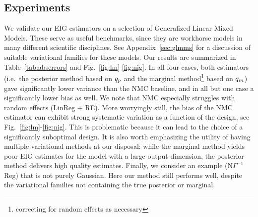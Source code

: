 \subsection{Experiments}
\label{sec:experiments}

We validate our EIG estimators on a selection of Generalized Linear Mixed Models. These serve as useful benchmarks, since they are workhorse models in many different scientific disciplines. See Appendix~\ref{sec:glmms} for a discussion of suitable variational families for these models. Our results are summarized in Table~\ref{tab:abserrors} and Fig.~\ref{fig:lm}-\ref{fig:nig}. In all four cases, both estimators
(i.e.~the posterior method based on $q_p$ and the marginal method\footnote{correcting for random effects as necessary} based on $q_m$) 
gave significantly lower variance than the NMC baseline, and in all but one case a
significantly lower bias as well. We note that NMC especially struggles with random effects (LinReg + RE). More worryingly still, the bias of the NMC estimator can exhibit strong systematic variation as a function of the design, see Fig.~\ref{fig:lm}-\ref{fig:nig}. This is problematic because it can lead to the choice of a significantly suboptimal design. It is also worth emphasizing the utility of having multiple variational methods at our disposal: while the marginal method yields poor EIG estimates for the model with a large output dimension, the posterior method delivers high quality estimates. 
Finally, we consider an example (N$\Gamma^{-1}$Reg) that is not purely Gaussian. Here our method still performs well, despite the variational families not containing the true posterior or marginal.

%

